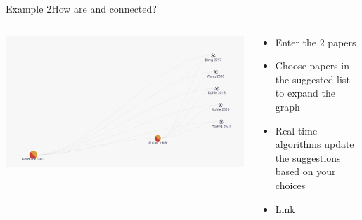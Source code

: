 \documentclass[aspectratio=43]{beamer}
\begin{document}
\begin{frame}{Example 2}{How are \cite{shiller1989survey} and \cite{kermack_contribution_1927} connected?}
    \begin{columns}[T]
    \vspace{0pt}
    \begin{column}{.60\textwidth}
        \includegraphics[width=\textwidth]{figures/Exam2.png}

        \vspace*{50mm} %
    \end{column}
    
    \hfill
    
    \begin{column}{.40\textwidth}
        \begin{itemize}
         \item Enter the 2 papers
            \item Choose papers in the suggested list to expand the graph
            \item Real-time algorithms update the suggestions based on your choices
           \item \href{https://app.litmaps.co/shared/7BEBACD2-2307-48D5-91B0-F904C09CD15D}{Link}
        \end{itemize}
        
    \end{column}
    \end{columns}
\end{frame}
\end{document}
